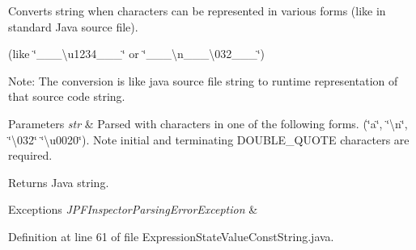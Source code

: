 Converts string when characters can be represented in various forms (like in standard Java source file). 

(like \char`\"{}\+\_\+\+\_\+\+\_\+\textbackslash{}u1234\+\_\+\+\_\+\+\_\+\char`\"{} or \char`\"{}\+\_\+\+\_\+\+\_\+\textbackslash{}n\+\_\+\+\_\+\+\_\+\textbackslash{}032\+\_\+\+\_\+\+\_\+\char`\"{})

Note\+: The conversion is like java source file string to runtime representation of that source code string.


\begin{DoxyParams}{Parameters}
{\em str} & Parsed with characters in one of the following forms. (\char`\"{}a\char`\"{}, \char`\"{}\textbackslash{}n\char`\"{}, \char`\"{}\textbackslash{}032\char`\"{} \char`\"{}\textbackslash{}u0020\char`\"{}). Note initial and terminating D\+O\+U\+B\+L\+E\+\_\+\+Q\+U\+O\+TE characters are required. \\
\hline
\end{DoxyParams}
\begin{DoxyReturn}{Returns}
Java string.
\end{DoxyReturn}

\begin{DoxyExceptions}{Exceptions}
{\em J\+P\+F\+Inspector\+Parsing\+Error\+Exception} & \\
\hline
\end{DoxyExceptions}


Definition at line 61 of file Expression\+State\+Value\+Const\+String.\+java.


